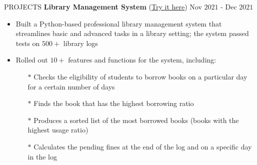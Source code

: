 \documentclass{resume} %
\begin{document}
\begin{rSection}{PROJECTS}
{\bf Library Management System }{(\href{https://github.com/harshitjain17/Library-Management-System}{Try it here})} \hfill Nov $2021$ - Dec $2021$
\begin{itemize}[itemsep = -4pt]
    \item Built a Python-based professional library management system that streamlines basic and advanced tasks in a library setting; the system passed tests on $500+$ library logs
    \item Rolled out $10+$ features and functions for the system, including:
    \begin{itemize}[itemsep = -4pt]
        \item[$*$] Checks the eligibility of students to borrow books on a particular day for a certain number of days
        \item[$*$] Finds the book that has the highest borrowing ratio
        \item[$*$] Produces a sorted list of the most borrowed books (books with the highest usage ratio)
        \item[$*$] Calculates the pending fines at the end of the log and on a specific day in the log
    \end{itemize}
\end{itemize}

\end{rSection} 



 
\end{document}
